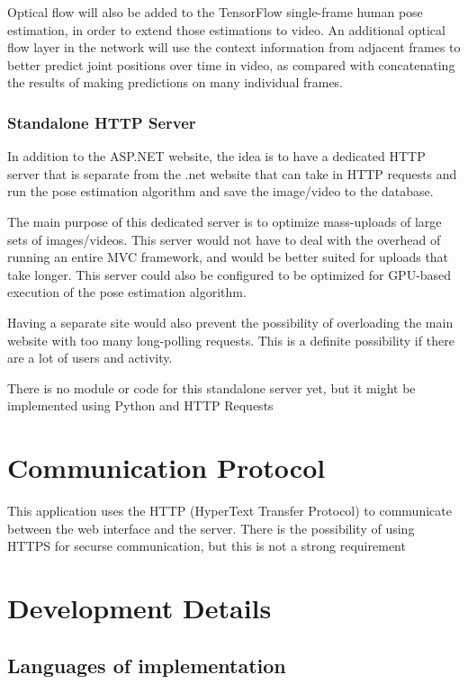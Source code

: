\documentclass{scrreprt}
\begin{document}
Optical flow will also be added to the TensorFlow single-frame human pose
estimation, in order to extend those estimations to video. An additional
optical flow layer in the network will use the context information from
adjacent frames to better predict joint positions over time in video, as
compared with concatenating the results of making predictions on many
individual frames.

\subsection{Standalone HTTP Server}

In addition to the ASP.NET website, the idea is to have a dedicated HTTP server
that is separate from the .net website that can take in HTTP requests and run
the pose estimation algorithm and save the image/video to the database.

The main purpose of this dedicated server is to optimize mass-uploads of large
sets of images/videos. This server would not have to deal with the overhead of
running an entire MVC framework, and would be better suited for uploads that
take longer. This server could also be configured to be optimized for GPU-based
execution of the pose estimation algorithm.

Having a separate site would also prevent the possibility of overloading the
main website with too many long-polling requests. This is a definite
possibility if there are a lot of users and activity.

There is no module or code for this standalone server yet, but it might be
implemented using Python and HTTP Requests


\chapter{Communication Protocol}

This application uses the HTTP (HyperText Transfer Protocol) to communicate
between the web interface and the server. There is the possibility of using
HTTPS for securse communication, but this is not a strong requirement


\chapter{Development Details}

\section{Languages of implementation}
\end{document}
